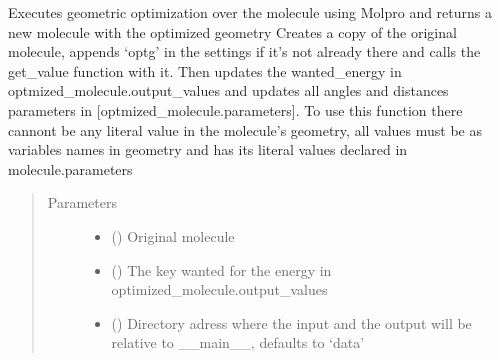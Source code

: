 \documentclass[letterpaper,10pt,english]{sphinxmanual}
\begin{document}

\begin{fulllineitems}
\label{\detokenize{molecular:molecular.optg}}
\sphinxAtStartPar
Executes geometric optimization over the molecule using Molpro and returns a new molecule with the optimized
geometry
Creates a copy of the original molecule, appends ‘optg’ in the settings if it’s not already there and calls the
get\_value function with it. Then updates the wanted\_energy in optmized\_molecule.output\_values and updates all angles
and distances parameters in {[}optmized\_molecule.parameters{]}. To use this function there cannont be any literal value
in the molecule’s geometry, all values must be as variables names in geometry and has its literal values declared in
molecule.parameters
\begin{quote}\begin{description}
\item[{Parameters}] \leavevmode\begin{itemize}
\item {} 
\sphinxAtStartPar
{} ({\hyperref[\detokenize{molecular:molecular.Molecule}]{}}) \textendash{} Original molecule

\item {} 
\sphinxAtStartPar
{} () \textendash{} The key wanted for the energy in optimized\_molecule.output\_values

\item {} 
\sphinxAtStartPar
{} (\sphinxstyleliteralemphasis{\sphinxupquote{, }}) \textendash{} Directory adress where the input and the output will be relative to \_\_main\_\_, defaults to ‘data’


\end{itemize}
\end{description}
\end{quote}
\end{fulllineitems}
\end{document}
